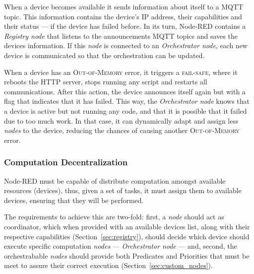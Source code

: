 When a device becomes available it sends information about itself to a MQTT topic. This information contains the device's IP address, their capabilities and their status --- if the device has failed before. In its turn, Node-RED contains a \textit{Registry node} that listens to the announcements MQTT topics and saves the devices information. If this \textit{node} is connected to an \textit{Orchestrator node}, each new device is communicated so that the orchestration can be updated.

When a device has an \textsc{Out-of-Memory} error, it triggers a \textsc{fail-safe}, where it reboots the HTTP server, stops running any script and restarts all communications. After this action, the device announces itself again but with a flag that indicates that it has failed. This way, the \textit{Orchestrator node} knows that a device is active but not running any code, and that it is possible that it failed due to too much work. In that case, it can dynamically adapt and assign less \textit{nodes} to the device, reducing the chances of causing another \textsc{Out-of-Memory} error.

\subsubsection{Computation Decentralization}\label{sec:node_red_computation_decentralization}

Node-RED must be capable of distribute computation amongst available resources (\ie devices), thus, given a set of tasks, it must assign them to available devices, ensuring that they will be performed.

The requirements to achieve this are two-fold: first, a \textit{node} should act as coordinator, which when provided with an available devices list, along with their respective capabilities (\cf Section~\ref{sec:registry}), should decide which device should execute specific computation \textit{nodes} --- \textit{Orchestrator node} --- and, second, the orchestrabable \textit{nodes} should provide both Predicates and Priorities that must be meet to assure their correct execution (\cf Section~\ref{sec:custom_nodes}).


